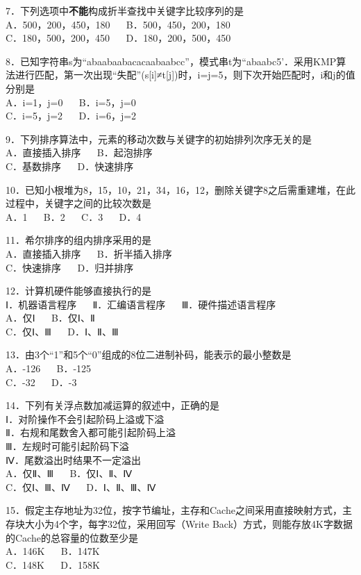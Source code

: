 7．下列选项中\textbf{不能}构成折半查找中关键字比较序列的是 \\
A．500，200，450，180 $\quad$ B．500，450，200，180 \\
C．180，500，200，450 $\quad$ D．180，200，500，450

8．已知字符串s为“abaabaabacacaabaabcc”，模式串t为“abaabc5’．采用KMP算法进行匹配，第一次出现“失配”(s[i]≠t[j])时，i=j=5，则下次开始匹配时，i和j的值分别是 \\
A．i=1，j=0 $\quad$ B．i=5，j=0 \\
C．i=5，j=2 $\quad$ D．i=6，j=2

9．下列排序算法中，元素的移动次数与关键字的初始排列次序无关的是 \\
A．直接插入排序 $\quad$ B．起泡排序 \\
C．基数排序 $\quad$ D．快速排序

10．已知小根堆为8，15，10，21，34，16，12，删除关键字8之后需重建堆，在此过程中，关键字之间的比较次数是 \\
A．1 $\quad$ B．2 $\quad$ C．3 $\quad$ D．4

11．希尔排序的组内排序采用的是 \\
A．直接插入排序 $\quad$ B．折半插入排序 \\
C．快速排序 $\quad$ D．归并排序

12．计算机硬件能够直接执行的是 \\
Ⅰ．机器语言程序 $\quad$ Ⅱ．汇编语言程序 $\quad$ Ⅲ．硬件描述语言程序 \\
A．仅Ⅰ $\quad$ B．仅Ⅰ、Ⅱ \\
C．仅Ⅰ、Ⅲ $\quad$ D．Ⅰ、Ⅱ、Ⅲ

13．由3个“1”和5个“0”组成的8位二进制补码，能表示的最小整数是 \\
A．-126 $\quad$ B．-125 \\
C．-32 $\quad$ D．-3

14．下列有关浮点数加减运算的叙述中，正确的是 \\
Ⅰ．对阶操作不会引起阶码上溢或下溢 \\
Ⅱ．右规和尾数舍入都可能引起阶码上溢 \\
Ⅲ．左规时可能引起阶码下溢 \\
Ⅳ．尾数溢出时结果不一定溢出 \\
A．仅Ⅱ、Ⅲ $\quad$ B．仅Ⅰ、Ⅱ、Ⅳ \\
C．仅Ⅰ、Ⅲ、Ⅳ $\quad$ D．Ⅰ、Ⅱ、Ⅲ、Ⅳ

15．假定主存地址为32位，按字节编址，主存和Cache之间采用直接映射方式，主存块大小为4个字，每字32位，采用回写（Write Back）方式，则能存放4K字数据的Cache的总容量的位数至少是 \\
A．146K $\quad$ B．147K \\
C．148K $\quad$ D．158K

